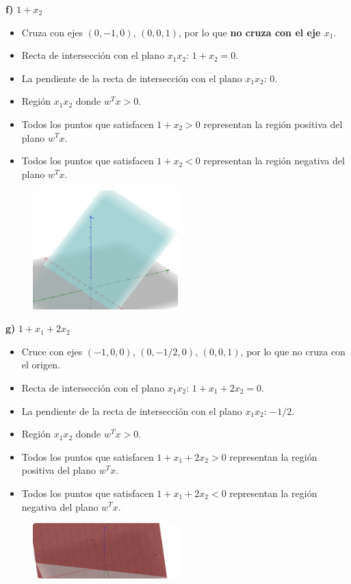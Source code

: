 \documentclass{article}
\begin{document}
\textbf{f) } $1 + x_2$  
\begin{itemize}
    \item Cruza con ejes $(0, -1, 0)$, $(0, 0, 1)$, por lo que \textbf{no cruza con el eje $x_1$}.
    \item Recta de intersección con el plano $x_1x_2$: $1 + x_2 = 0$.
    \item La pendiente de la recta de intersección con el plano $x_1x_2$: $0$.
    \item Región $x_1x_2$ donde $w^T x > 0$.
    \item Todos los puntos que satisfacen $1 + x_2 > 0$ representan la región positiva del plano $w^T x$.
    \item Todos los puntos que satisfacen $1 + x_2 < 0$ representan la región negativa del plano $w^T x$.
\end{itemize}
\begin{figure}[H]
    \centering
    \includegraphics[width=0.5\textwidth]{Imagen6.png}  %
\end{figure}
\textbf{g) } $1 + x_1 + 2x_2$  
\begin{itemize}
    \item Cruce con ejes $(-1, 0, 0)$, $(0, -1/2, 0)$, $(0, 0, 1)$, por lo que no cruza con el origen.
    \item Recta de intersección con el plano $x_1x_2$: $1 + x_1 + 2x_2 = 0$.
    \item La pendiente de la recta de intersección con el plano $x_1x_2$: $-1/2$.
    \item Región $x_1x_2$ donde $w^T x > 0$.
    \item Todos los puntos que satisfacen $1 + x_1 + 2x_2 > 0$ representan la región positiva del plano $w^T x$.
    \item Todos los puntos que satisfacen $1 + x_1 + 2x_2 < 0$ representan la región negativa del plano $w^T x$.
\end{itemize}
\begin{figure}[H]
    \centering
    \includegraphics[width=0.5\textwidth]{Imagen7.png}  %
\end{figure}
\end{document}
